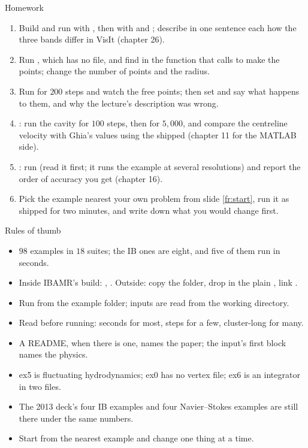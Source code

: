 \documentclass[aspectratio=169,11pt]{beamer}
\begin{document}
\begin{frame}{Homework}
\label{fr:hw}
\footnotesize
\begin{enumerate}
  \item Build and run  with , then with  and ; describe in one sentence each how the three bands differ in VisIt (chapter 26).
  \item Run , which has no  file, and find in  the function that  calls to make the points; change the number of points and the radius.
  \item Run  for $200$ steps and watch the free points; then set  and say what happens to them, and why the lecture's description was wrong.
  \item {}: run the cavity for $100$ steps, then for $5{,}000$, and compare the centreline velocity with Ghia's values using the shipped  (chapter 11 for the MATLAB side).
  \item {}: run  (read it first; it runs the example at several resolutions) and report the order of accuracy you get (chapter 16).
  \item Pick the example nearest your own problem from slide \ref{fr:start}, run it as shipped for two minutes, and write down what you would change first.
\end{enumerate}
\end{frame}

\begin{frame}{Rules of thumb}
\label{fr:thumb}
\small
\begin{itemize}
  \item $98$ examples in $18$ suites; the IB ones are eight, and five of them run in seconds.
  \item Inside IBAMR's build: , . Outside: copy the folder, drop in the plain , link .
  \item Run from the example folder; inputs are read from the working directory.
  \item Read  before running: seconds for most, steps for a few, cluster-long for many.
  \item A README, when there is one, names the paper; the input's first block names the physics.
  \item ex5 is fluctuating hydrodynamics; ex0 has no vertex file; ex6 is an integrator in two files.
  \item The 2013 deck's four IB examples and four Navier--Stokes examples are still there under the same numbers.
  \item Start from the nearest example and change one thing at a time.
\end{itemize}
\end{frame}
\end{document}
